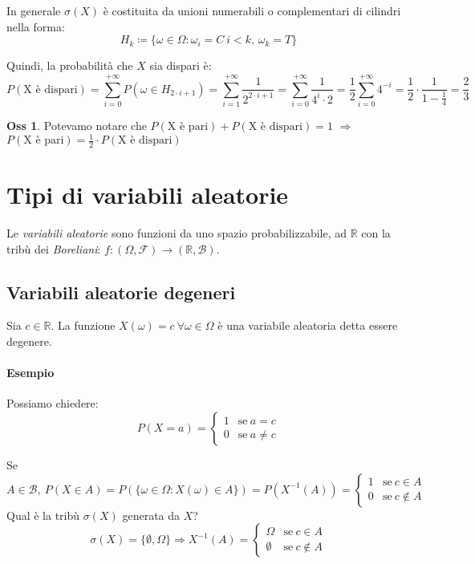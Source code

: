 \documentclass[12pt, a4paper]{report}
\theoremstyle{definition}
\newtheorem*{observation}{Oss}
\DeclareRobustCommand{\F}{\mathcal{F}}%
\DeclareRobustCommand{\R}{\mathbb{R}}%
\DeclareRobustCommand{\B}{\mathcal{B}}%
\DeclareRobustCommand{\probzspace}{(\Omega,\F)}
\begin{document}
In generale $\sigma(X)$ è costituita da unioni numerabili o complementari di
cilindri nella forma:
\[H_k\coloneqq\{\omega\in\Omega:\omega_i=C\ i<k,\, \omega_k=T\}\]

Quindi, la probabilità che $X$ sia dispari è:
\[P(\text{X è dispari})=\sum_{i=0}^{+\infty}P(\omega\in H_{2\cdot i+1})=\sum_{i=1}^
{+\infty}\frac{1}{2^{2\cdot i+1}}=\sum_{i=0}^{+\infty}\frac{1}{4^i\cdot 2}=\frac{1}{2}\sum
_{i=0}^{+\infty}4^{-i}=\frac{1}{2}\cdot \frac{1}{1-\frac{1}{4}}=\frac{2}{3}\]

\begin{observation}
	Potevamo notare che \(P(\text{X è pari})+P(\text{X è dispari})=1\)
	$\Rightarrow$ \(P(\text{X è pari})=\frac{1}{2}\cdot P(\text{X è dispari})\)
\end{observation}

\section{Tipi di variabili aleatorie}
Le \emph{variabili aleatorie} sono funzioni da uno spazio probabilizzabile, ad
$\R$ con la tribù dei \emph{Boreliani}: \(f:\probzspace\rightarrow(\R,\B)\).

\subsection{Variabili aleatorie degeneri}
Sia $c\in\R$. La funzione \(X(\omega)=c\ \forall\omega\in\Omega\) è una variabile
aleatoria detta essere degenere.

\paragraph*{Esempio}
Possiamo chiedere:
\[P(X=a)=\begin{cases}
	{1} & \text{se}\ {a=c}\\
	{0} & \text{se}\ {a\neq c}
\end{cases}\]

Se \(A\in\B,\ P(X\in A)=P(\{\omega\in\Omega:X(\omega)\in A\})=P(X^{-1}(A))=
\begin{cases}
	{1} & \text{se}\ {c\in A}\\
	{0} & \text{se}\ {c\notin A}
\end{cases}\)
\\Qual è la tribù $\sigma(X)$ generata da $X$?
\[\sigma(X)=\{\emptyset, \Omega\}\Rightarrow X^{-1}(A)=
\begin{cases}
	\Omega & \text{se}\ c\in A\\
	\emptyset & \text{se}\ c\notin A
\end{cases}\]
\end{document}
